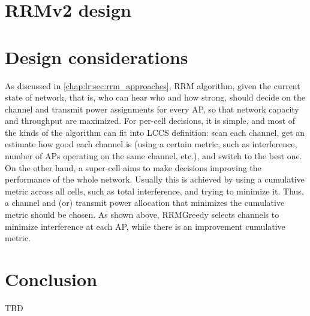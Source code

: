 \section{RRMv2 design}
\label{chap:research:sec:rrmv2}

\section{Design considerations}
As discussed in \ref{chap:lr:sec:rrm_approaches}, RRM algorithm, given the current state of network, that is, who can hear who and how strong, should decide on the channel and transmit power assignments for every AP, so that network capacity and throughput are maximized. For per-cell decisions, it is simple, and most of the kinds of the algorithm can fit into LCCS definition: scan each channel, get an estimate how good each channel is (using a certain metric, such as interference, number of APs operating on the same channel, etc.), and switch to the best one. On the other hand, a super-cell aims to make decisions improving the performance of the whole network. Usually this is achieved by using a cumulative metric across all cells, such as total interference, and trying to minimize it. Thus, a channel and (or) transmit power allocation that minimizes the cumulative metric should be chosen. As shown above, RRMGreedy selects channels to minimize interference at each AP, while there is an improvement cumulative metric.



\section{Conclusion}
\label{chap:research:sec:conclusion}
TBD